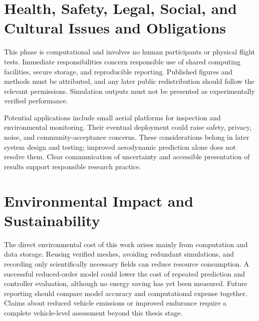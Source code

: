 
\FloatBarrier
\section{Health, Safety, Legal, Social, and Cultural Issues and Obligations}
This phase is computational and involves no human participants or physical flight tests. Immediate responsibilities concern responsible use of shared computing facilities, secure storage, and reproducible reporting. Published figures and methods must be attributed, and any later public redistribution should follow the relevant permissions. Simulation outputs must not be presented as experimentally verified performance.

Potential applications include small aerial platforms for inspection and environmental monitoring. Their eventual deployment could raise safety, privacy, noise, and community-acceptance concerns. These considerations belong in later system design and testing; improved aerodynamic prediction alone does not resolve them. Clear communication of uncertainty and accessible presentation of results support responsible research practice.

\section{Environmental Impact and Sustainability}
The direct environmental cost of this work arises mainly from computation and data storage. Reusing verified meshes, avoiding redundant simulations, and recording only scientifically necessary fields can reduce resource consumption. A successful reduced-order model could lower the cost of repeated prediction and controller evaluation, although no energy saving has yet been measured. Future reporting should compare model accuracy and computational expense together. Claims about reduced vehicle emissions or improved endurance require a complete vehicle-level assessment beyond this thesis stage.

